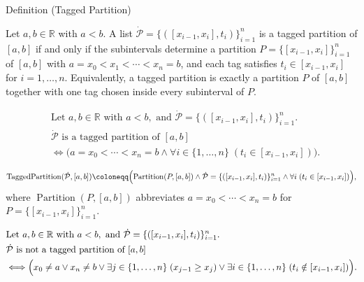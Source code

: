 \begin{definitionbox}{Definition (Tagged Partition)}
\begin{definition}
\label{def:tagged-partition}
Let $a,b \in \mathbb{R}$ with $a < b$. A list $\dot{\mathcal{P}}=\{([x_{i-1},x_i],t_i)\}_{i=1}^n$ is a tagged partition of $[a,b]$ if and only if the subintervals determine a partition $P=\{[x_{i-1},x_i]\}_{i=1}^n$ of $[a,b]$ with $a=x_0 < x_1 < \cdots < x_n=b$, and each tag satisfies $t_i \in [x_{i-1},x_i]$ for $i=1,\ldots,n$. Equivalently, a tagged partition is exactly a partition $P$ of $[a,b]$ together with one tag chosen inside every subinterval of $P$.
\end{definition}
\end{definitionbox}

\begin{remark*}
\[
\begin{aligned}
&\text{Let } a,b \in \mathbb{R} \text{ with } a<b, \text{ and } \dot{\mathcal{P}}=\{([x_{i-1},x_i],t_i)\}_{i=1}^n.\\
&\dot{\mathcal{P}} \text{ is a tagged partition of } [a,b]\\
&\Longleftrightarrow \bigl(a=x_0<\cdots<x_n=b \land \forall i \in \{1,\ldots,n\}\;(t_i \in [x_{i-1},x_i])\bigr).
\end{aligned}
\]
\end{remark*}

\begin{remark*}
\[
\operatorname{TaggedPartition}(\dot{\mathcal{P}},[a,b])
\coloneqq
\Bigl(\operatorname{Partition}(P,[a,b]) \land \dot{\mathcal{P}}=\{([x_{i-1},x_i],t_i)\}_{i=1}^n \land \forall i\;(t_i \in [x_{i-1},x_i])\Bigr),
\]
where $\operatorname{Partition}(P,[a,b])$ abbreviates $a=x_0<\cdots<x_n=b$ for $P=\{[x_{i-1},x_i]\}_{i=1}^n$.
\end{remark*}

\begin{remark*}
\[
\begin{aligned}
&\text{Let } a,b \in \mathbb{R} \text{ with } a<b, \text{ and } \dot{\mathcal{P}}=\{([x_{i-1},x_i],t_i)\}_{i=1}^n.\\
&\dot{\mathcal{P}} \text{ is not a tagged partition of } [a,b]\\
&\Longleftrightarrow
\Bigl(x_0\ne a \lor x_n\ne b \lor
\exists j \in \{1,\ldots,n\}\;(x_{j-1} \ge x_j) \lor
\exists i \in \{1,\ldots,n\}\;(t_i \notin [x_{i-1},x_i])\Bigr).
\end{aligned}
\]
\end{remark*}

